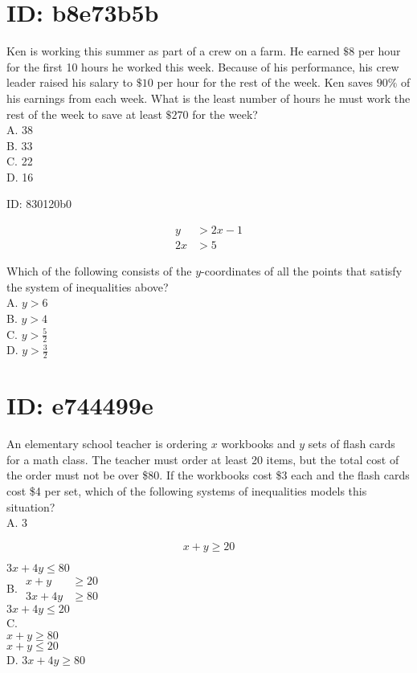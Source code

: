 \section*{ID: b8e73b5b}
Ken is working this summer as part of a crew on a farm. He earned $\$ 8$ per hour for the first 10 hours he worked this week. Because of his performance, his crew leader raised his salary to $\$ 10$ per hour for the rest of the week. Ken saves $90 \%$ of his earnings from each week. What is the least number of hours he must work the rest of the week to save at least $\$ 270$ for the week?\\
A. 38\\
B. 33\\
C. 22\\
D. 16

ID: 830120b0

$$
\begin{aligned}
y & >2 x-1 \\
2 x & >5
\end{aligned}
$$

Which of the following consists of the $y$-coordinates of all the points that satisfy the system of inequalities above?\\
A. $y>6$\\
B. $y>4$\\
C. $y>\frac{5}{2}$\\
D. $y>\frac{3}{2}$

\section*{ID: e744499e}
An elementary school teacher is ordering $x$ workbooks and $y$ sets of flash cards for a math class. The teacher must order at least 20 items, but the total cost of the order must not be over \$80. If the workbooks cost \$3 each and the flash cards cost \$4 per set, which of the following systems of inequalities models this situation?\\
A. 3

$$
x+y \geq 20
$$

$3 x+4 y \leq 80$\\
B. $\begin{aligned} x+y & \geq 20 \\ 3 x+4 y & \geq 80\end{aligned}$\\
$3 x+4 y \leq 20$\\
C.\\
$x+y \geq 80$\\
$x+y \leq 20$\\
D. $3 x+4 y \geq 80$

